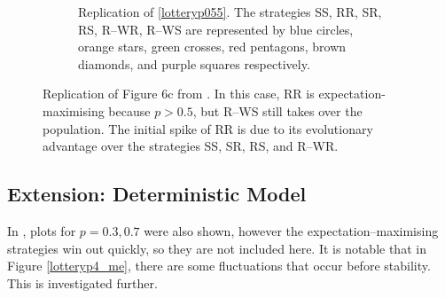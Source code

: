 \begin{figure}[!h]
\begin{subfigure}[b]{0.45\textwidth}
    \caption{Replication of \ref{lotteryp055}. The strategies SS, RR, SR, RS, R--WR, R--WS are represented by blue circles, orange stars, green crosses, red pentagons, brown diamonds, and purple squares respectively. }
    \label{lotteryp4_me_2}
  \end{subfigure}
  \caption{Replication of Figure 6c from \cite{RN30}. In this case, RR is expectation-maximising because $p>0.5$, but R--WS still takes over the population. The initial spike of RR is due to its evolutionary advantage over the strategies SS, SR, RS, and R--WR.} \label{lottery_comp5}
\end{figure} 
\FloatBarrier

\subsection{Extension: Deterministic Model}
In \cite{RN30}, plots for $p=0.3, 0.7$ were also shown, however the expectation--maximising strategies win out quickly, so they are not included here. It is notable that in Figure \ref{lotteryp4_me}, there are some fluctuations that occur before stability. This is investigated further. \\

